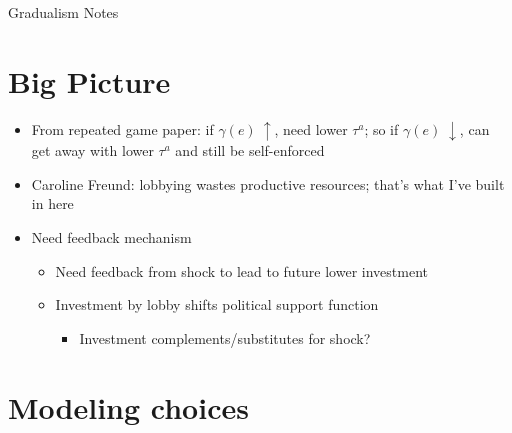 \documentclass[12pt]{article}
\newcommand{\ga}{\gamma}
\begin{document}
\begin{center}
Gradualism Notes
\end{center}


\section{Big Picture}
\begin{itemize}
	\item From repeated game paper: if $\ga(e) \: \uparrow$, need lower $\tau^a$; so if $\ga(e) \; \downarrow$, can get away with lower $\tau^a$ and still be self-enforced
	\item Caroline Freund: lobbying wastes productive resources; that's what I've built in here
	\item Need feedback mechanism
		\begin{itemize}
			\item Need feedback from shock to lead to future lower investment
			\item Investment by lobby shifts political support function
				\begin{itemize}
					\item Investment complements/substitutes for shock?
				\end{itemize}
		\end{itemize}
\end{itemize}

\section{Modeling choices}
\end{document}
